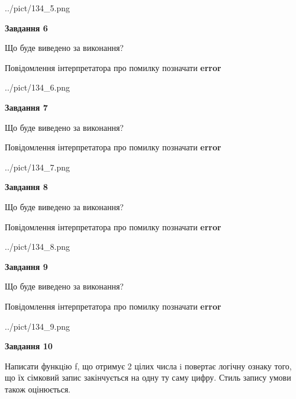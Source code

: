 \documentclass[12pt, ukrainian]{article}
\begin{document}
{\begin {large}
\begin{center}
	{../pict/134_5.png}
\end{center}
\newpage

{\begin {center}\textbf{Завдання 6}\end {center}}\par
Що буде виведено за виконання? \par
Повідомлення інтерпретатора про помилку позначати \textbf{error}

\begin{center}
	{../pict/134_6.png}
\end{center}
\newpage

{\begin {center}\textbf{Завдання 7}\end {center}}\par
Що буде виведено за виконання? \par
Повідомлення інтерпретатора про помилку позначати \textbf{error}

\begin{center}
	{../pict/134_7.png}
\end{center}
\newpage

{\begin {center}\textbf{Завдання 8}\end {center}}\par
Що буде виведено за виконання? \par
Повідомлення інтерпретатора про помилку позначати \textbf{error}

\begin{center}
	{../pict/134_8.png}
\end{center}
\newpage

{\begin {center}\textbf{Завдання 9}\end {center}}\par
Що буде виведено за виконання? \par
Повідомлення інтерпретатора про помилку позначати \textbf{error}

\begin{center}
	{../pict/134_9.png}
\end{center}
\newpage

{\begin {center}\textbf{Завдання 10}\end {center}}\par

Написати функцiю f, що отримує 2 цілих числа i повертає логічну ознаку того, що їх сімковий запис закінчується на одну ту саму цифру. Стиль запису умови також оцінюється.\par
\newpage

\end {large}}
\end{document}
